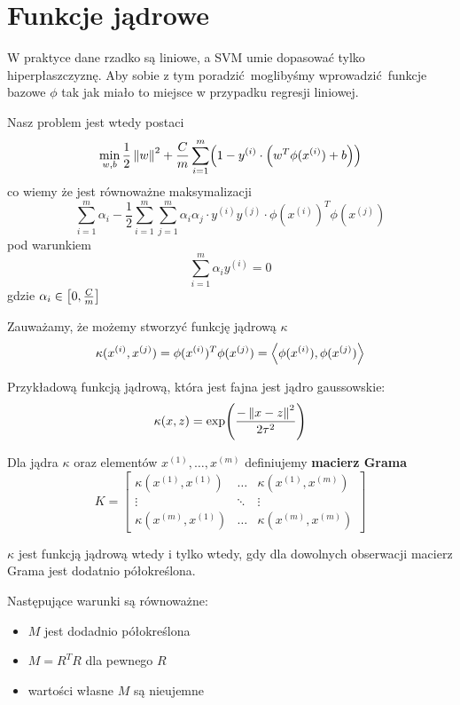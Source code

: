 \section{Funkcje jądrowe}

W praktyce dane rzadko są liniowe, a SVM umie dopasować tylko hiperpłaszczyznę.
Aby sobie z tym poradzić moglibyśmy wprowadzić funkcje bazowe \( \phi \) tak jak miało to miejsce w przypadku regresji liniowej.

Nasz problem jest wtedy postaci
\[
    \min_{w, b} \frac{1}{2} \norm{w}^2 + \frac{C}{m}\sum_{i=1}^m \pars{1 - y^{(i)} \cdot \pars{w^T \phi(x^{(i)}) + b}}
\]
co wiemy że jest równoważne maksymalizacji
\[
    \sum_{i=1}^m \alpha_i - \frac{1}{2} \sum_{i=1}^m \sum_{j=1}^m \alpha_i \alpha_j \cdot y^{(i)}y^{(j)} \cdot \phi(x^{(i)})^T\phi(x^{(j)})
\]
pod warunkiem
\[
    \sum_{i=1}^m \alpha_i y^{(i)} = 0
\]
gdzie \( \alpha_i \in \left[0, \frac{C}{m}\right] \)

Zauważamy, że możemy stworzyć funkcję jądrową \( \kappa \)
\[
    \kappa(x^{(i)}, x^{(j)}) = \phi(x^{(i)})^T\phi(x^{(j)}) = \left\langle \phi(x^{(i)}), \phi(x^{(j)})\right\rangle
\]

Przykładową funkcją jądrową, która jest fajna jest jądro gaussowskie:
\[
    \kappa(x, z) = \exp\pars{\frac{-\norm{x - z}^2}{2\tau^2}}
\]

\begin{definition}
Dla jądra \( \kappa \) oraz elementów \( x^{(1)}, \dots, x^{(m)} \) definiujemy \textbf{macierz Grama}
\[
    K = \begin{bmatrix}
    \kappa(x^{(1)}, x^{(1)}) & \hdots & \kappa(x^{(1)}, x^{(m)}) \\
    \vdots & \ddots & \vdots \\
    \kappa(x^{(m)}, x^{(1)}) & \hdots & \kappa(x^{(m)}, x^{(m)})
    \end{bmatrix}
\]
\end{definition}

\begin{theorem}[Mercer]
    \( \kappa \) jest funkcją jądrową wtedy i tylko wtedy, gdy dla dowolnych obserwacji macierz Grama jest dodatnio półokreślona.
\end{theorem}
\begin{theorem}
    Następujące warunki są równoważne:
    \begin{itemize}
        \item \( M \) jest dodadnio półokreślona
        \item \( M = R^TR \) dla pewnego \( R \)
        \item wartości własne \( M \) są nieujemne
    \end{itemize}
\end{theorem}

